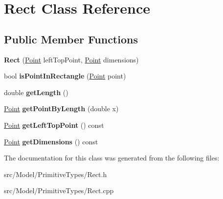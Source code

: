 \hypertarget{classRect}{}\section{Rect Class Reference}
\label{classRect}
\subsection*{Public Member Functions}
\begin{DoxyCompactItemize}
\item 
{\bfseries Rect} (\hyperlink{classPoint}{Point} left\+Top\+Point, \hyperlink{classPoint}{Point} dimensions)\hypertarget{classRect_a6d67b4bf530ff5a713179a30baab93ae}{}\label{classRect_a6d67b4bf530ff5a713179a30baab93ae}

\item 
bool {\bfseries is\+Point\+In\+Rectangle} (\hyperlink{classPoint}{Point} point)\hypertarget{classRect_ac53055355aaf7ea64aa4e3df45fa5df2}{}\label{classRect_ac53055355aaf7ea64aa4e3df45fa5df2}

\item 
double {\bfseries get\+Length} ()\hypertarget{classRect_aae9cbbe4d0a491ac9750a75f71fe0646}{}\label{classRect_aae9cbbe4d0a491ac9750a75f71fe0646}

\item 
\hyperlink{classPoint}{Point} {\bfseries get\+Point\+By\+Length} (double x)\hypertarget{classRect_a1099164a8e1222c309973c892da55692}{}\label{classRect_a1099164a8e1222c309973c892da55692}

\item 
\hyperlink{classPoint}{Point} {\bfseries get\+Left\+Top\+Point} () const \hypertarget{classRect_a4d555af3860e002d7e6757a9ecb13f45}{}\label{classRect_a4d555af3860e002d7e6757a9ecb13f45}

\item 
\hyperlink{classPoint}{Point} {\bfseries get\+Dimensions} () const \hypertarget{classRect_a6c02e75b0bb15164383474f2b66c03ec}{}\label{classRect_a6c02e75b0bb15164383474f2b66c03ec}

\end{DoxyCompactItemize}


The documentation for this class was generated from the following files\+:\begin{DoxyCompactItemize}
\item 
src/\+Model/\+Primitive\+Types/Rect.\+h\item 
src/\+Model/\+Primitive\+Types/Rect.\+cpp\end{DoxyCompactItemize}

